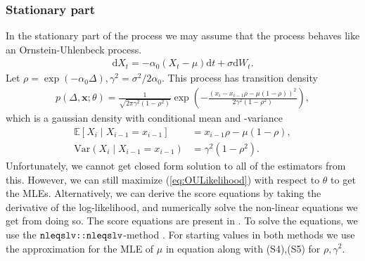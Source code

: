 \subsubsection{Stationary part}\label{subsubsec:OUprocessStationary}
In the stationary part of the process we may assume that the process behaves like an Ornstein-Uhlenbeck process. 
\begin{align}
    \mathrm{d}X_t = -\alpha_0\left(X_t-\mu\right) \mathrm{d}t + \sigma \mathrm{d}W_t.
\end{align}
Let $\rho = \exp\left(-\alpha_0\Delta\right), \gamma^2 = \sigma^2/2\alpha_0$. This process has transition density \cite{DitlevsenSupplementary}
\begin{align}
    p\left(\Delta, \mathbf{x};\theta\right) = \frac{1}{\sqrt{2\pi\gamma^2\left(1-\rho^2\right)}}\exp\left(-\frac{\left(x_i-x_{i-1}\rho - \mu\left(1-\rho\right)\right)^2}{2\gamma^2\left(1-\rho^2\right)}\right), \label{eq:OULikelihood}
\end{align}
which is a gaussian density with conditional mean and -variance
\begin{align}
    \mathbb{E}\left[X_i\middle|X_{i-1} = x_{i-1}\right] &= x_{i - 1}\rho - \mu\left(1-\rho\right),\\
    \mathrm{Var}\left(X_i\middle|X_{i-1} = x_{i-1}\right) &= \gamma^2\left(1-\rho^2\right).
\end{align}
Unfortunately, we cannot get closed form solution to all of the estimators from this. However, we can still maximize (\ref{eq:OULikelihood}) with respect to $\theta$ to get the MLEs. Alternatively, we can derive the score equations by taking the derivative of the log-likelihood, and numerically solve the non-linear equations we get from doing so. The score equations are present in \cite{DitlevsenSupplementary}. To solve the equations, we use the $\texttt{nleqslv::nleqslv}$-method \cite{nleqslv}. For starting values in both methods we use the approximation for the MLE of $\mu$ in equation \cite[(S4)]{DitlevsenSupplementary} along with (S4),(S5) for $\rho, \gamma^2$. 
